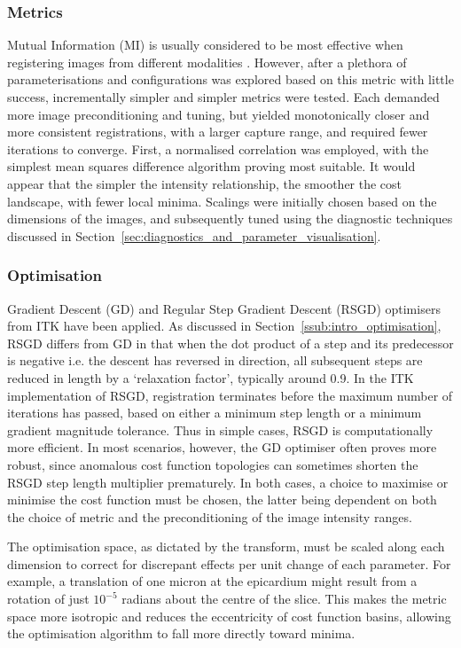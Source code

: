     \subsubsection{Metrics} %
    \label{ssub:metrics}
      Mutual Information (MI) is usually considered to be most effective when registering images from different modalities \cite{Wells1996}. However, after a plethora of parameterisations and configurations was explored based on this metric with little success, incrementally simpler and simpler metrics were tested. Each demanded more image preconditioning and tuning, but yielded monotonically closer and more consistent registrations, with a larger capture range, and required fewer iterations to converge. First, a normalised correlation was employed, with the simplest mean squares difference algorithm proving most suitable. It would appear that the simpler the intensity relationship, the smoother the cost landscape, with fewer local minima. Scalings were initially chosen based on the dimensions of the images, and subsequently tuned using the diagnostic techniques discussed in Section~\ref{sec:diagnostics_and_parameter_visualisation}.
  
    \subsubsection{Optimisation} %
    \label{ssub:optimisation}
      Gradient Descent (GD) and Regular Step Gradient Descent (RSGD) optimisers from ITK have been applied. As discussed in Section~\ref{ssub:intro_optimisation}, RSGD differs from GD in that when the dot product of a step and its predecessor is negative i.e. the descent has reversed in direction, all subsequent steps are reduced in length by a `relaxation factor', typically around 0.9. In the ITK implementation of RSGD, registration terminates before the maximum number of iterations has passed, based on either a minimum step length or a minimum gradient magnitude tolerance. Thus in simple cases, RSGD is computationally more efficient. In most scenarios, however, the GD optimiser often proves more robust, since anomalous cost function topologies can sometimes shorten the RSGD step length multiplier prematurely. In both cases, a choice to maximise or minimise the cost function must be chosen, the latter being dependent on both the choice of metric and the preconditioning of the image intensity ranges.

      The optimisation space, as dictated by the transform, must be scaled along each dimension to correct for discrepant effects per unit change of each parameter. For example, a translation of one micron at the epicardium might result from a rotation of just $10^{-5}$ radians about the centre of the slice. This makes the metric space more isotropic and reduces the eccentricity of cost function basins, allowing the optimisation algorithm to fall more directly toward minima.

